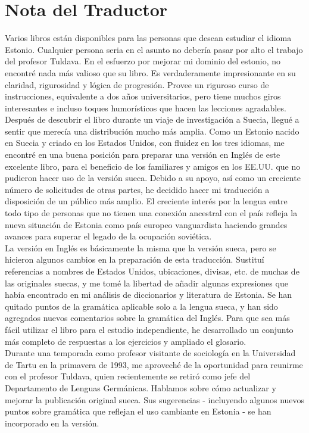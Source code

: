 \section*{Nota del Traductor}

Varios libros están disponibles para las personas que desean estudiar el idioma Estonio. Cualquier persona seria en el asunto no debería pasar por alto el trabajo del profesor Tuldava. En el esfuerzo por mejorar mi dominio del estonio, no encontré nada más valioso que su libro. Es verdaderamente impresionante en su claridad, rigurosidad y lógica de progresión. Provee un riguroso curso de instrucciones, equivalente a dos años universitarios, pero tiene muchos giros interesantes e incluso toques humorísticos que hacen las lecciones agradables.\\

Después de descubrir el libro durante un viaje de investigación a Suecia, llegué a sentir que merecía una distribución mucho más amplia. Como un Estonio nacido en Suecia y criado en los Estados Unidos, con fluidez en los tres idiomas, me encontré en una buena posición para preparar una versión en Inglés de este excelente libro, para el beneficio de los familiares y amigos en los EE.UU. que no pudieron hacer uso de la versión sueca. Debido a su apoyo, así como un creciente número de solicitudes de otras partes, he decidido hacer mi traducción a disposición de un público más amplio. El creciente interés por la lengua entre todo tipo de personas que no tienen una conexión ancestral con el país refleja la nueva situación de Estonia como país europeo vanguardista haciendo grandes avances para superar el legado de la ocupación soviética.\\

La versión en Inglés es básicamente la misma que la versión sueca, pero se hicieron algunos cambios en la preparación de esta traducción. Sustituí referencias a nombres de Estados Unidos, ubicaciones, divisas, etc. de muchas de las originales suecas, y me tomé la libertad de añadir algunas expresiones que había encontrado en mi análisis de diccionarios y literatura de Estonia. Se han quitado puntos de la gramática aplicable solo a la lengua sueca, y han sido agregados nuevos comentarios sobre la gramática del Inglés. Para que sea más fácil utilizar el libro para el estudio independiente, he desarrollado un conjunto más completo de respuestas a los ejercicios y ampliado el glosario.\\

Durante una temporada como profesor visitante de sociología en la Universidad de Tartu en la primavera de 1993, me aproveché de la oportunidad para reunirme con el profesor Tuldava, quien recientemente se retiró como jefe del Departamento de Lenguas Germánicas. Hablamos sobre cómo actualizar y mejorar la publicación original sueca. Sus sugerencias - incluyendo algunos nuevos puntos sobre gramática que reflejan el uso cambiante en Estonia - se han incorporado en la versión.\\

